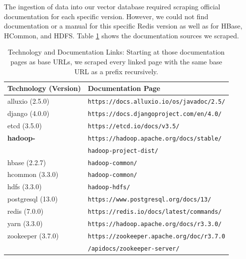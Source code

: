 The ingestion of data into our vector database required scraping official documentation for each specific version. However, we could not find documentation or a manual for this specific Redis version as well as for HBase, HCommon, and HDFS. Table \ref{tab:technology_documentation} shows the documentation sources we scraped.

\begin{table}[h]
    \centering
    \begin{tabular}{|l|l|}
        \hline
        \textbf{Technology (Version)} & \textbf{Documentation Page} \\
        \hline
        alluxio (2.5.0) & \texttt{https://docs.alluxio.io/os/javadoc/2.5/} \\
        django (4.0.0) & \texttt{https://docs.djangoproject.com/en/4.0/} \\
        etcd (3.5.0) & \texttt{https://etcd.io/docs/v3.5/} \\
        \textbf{hadoop-} & \texttt{https://hadoop.apache.org/docs/stable/}\\
        & \hspace{0.25cm} \texttt{hadoop-project-dist/} \\
        \hspace{0.15cm} hbase (2.2.7) & \hspace{0.5cm} \texttt{hadoop-common/} \\
        \hspace{0.15cm} hcommon (3.3.0) & \hspace{0.5cm} \texttt{hadoop-common/} \\
        \hspace{0.15cm} hdfs (3.3.0) & \hspace{0.5cm} \texttt{hadoop-hdfs/} \\
        postgresql (13.0) & \texttt{https://www.postgresql.org/docs/13/} \\
        redis (7.0.0) & \texttt{https://redis.io/docs/latest/commands/} \\
        yarn (3.3.0) & \texttt{https://hadoop.apache.org/docs/r3.3.0/} \\
        zookeeper (3.7.0) & \texttt{https://zookeeper.apache.org/doc/r3.7.0} \\
        & \hspace{0.25cm} \texttt{/apidocs/zookeeper-server/} \\
        \hline
    \end{tabular}
    \caption{Technology and Documentation Links: Starting at those documentation pages as base URLs, we scraped every linked page with the same base URL as a prefix recursively.}
    \label{tab:technology_documentation}
\end{table}

